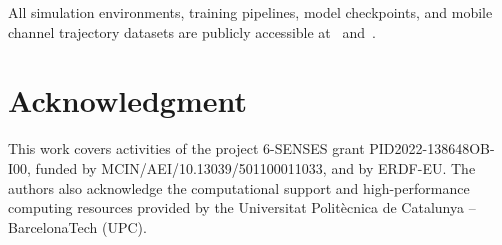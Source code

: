 \documentclass{ieeetmlcn}
\begin{document}
All simulation environments, training pipelines, model checkpoints, and mobile channel trajectory datasets are publicly accessible at~\cite{code} and~\cite{dataset}.

\section*{Acknowledgment}
This work covers activities of the project 6-SENSES grant PID2022-138648OB-I00, funded by MCIN/AEI/10.13039/501100011033, and by ERDF-EU. The authors also acknowledge the computational support and high-performance computing resources provided by the Universitat Polit\`ecnica de Catalunya -- BarcelonaTech (UPC).



\end{document}
